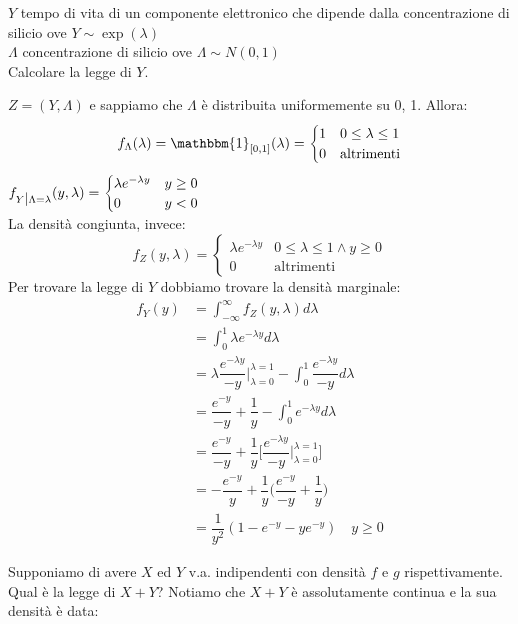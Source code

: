 \documentclass[12pt]{report}
\newcounter{exercise}
\begin{document}
	\begin{exercise}{}{}
		\begin{assignment}{}{}
			$Y$ tempo di vita di un componente elettronico che dipende dalla concentrazione di silicio ove $Y \sim \exp(\lambda)$ \\
			$\Lambda$ concentrazione di silicio ove $\Lambda \sim N(0, 1)$ \\
			Calcolare la legge di $Y$.
		\end{assignment}
		$Z = (Y, \Lambda)$ e sappiamo che $\Lambda$ è distribuita uniformemente su 0, 1. Allora:
		\[
		f_\Lambda(\lambda) = \mathbbm{1}_{[0,1]}(\lambda) = \begin{cases}
		1 & 0 \leq \lambda \leq 1 \\
		0 & \text{altrimenti}
		\end{cases}
		\]
		$f_{Y \mathlarger{\mid} \Lambda=\lambda}(y, \lambda) = \begin{cases}
			\lambda e^{-\lambda y} & y \geq 0 \\
			0 & y < 0
		\end{cases}$ \\
		La densità congiunta, invece:
		\[
		f_Z(y, \lambda) = \begin{cases}
			\lambda e^{-\lambda y} & 0 \leq \lambda \leq 1 \wedge y \geq 0 \\
			0 & \text{altrimenti}
		\end{cases}
		\]
		Per trovare la legge di $Y$ dobbiamo trovare la densità marginale:
		\begin{align*}
		f_Y(y) &= \int_{-\infty}^{\infty}f_Z(y, \lambda)d\lambda \\
		&= \int_{0}^{1}\lambda e^{-\lambda y}d\lambda \\
		&= \lambda \dfrac{e^{-\lambda y}}{-y} {\Big|}^{\lambda=1}_{\lambda=0} - \int_{0}^{1}\dfrac{e^{-\lambda y}}{-y}d\lambda \\
		&= \dfrac{e^{-y}}{-y}  + \dfrac{1}{y} - \int_{0}^{1}e^{-\lambda y}d\lambda \\
		&= \dfrac{e^{-y}}{-y}  + \dfrac{1}{y}\Bigg[\dfrac{e^{-\lambda y}}{-y} {\Big|}^{\lambda=1}_{\lambda=0}\Bigg] \\
		&= -\dfrac{e^{-y}}{y} + \dfrac{1}{y}\Bigg(\dfrac{e^{-y}}{-y} + \dfrac{1}{y}\Bigg) \\
		&= \dfrac{1}{y^2}(1 - e^{-y} - ye^{-y}) \quad y \geq 0
		\end{align*}
	\end{exercise}
	Supponiamo di avere $X$ ed $Y$ v.a. indipendenti con densità $f$ e $g$ rispettivamente. Qual è la legge di $X + Y$? Notiamo che $X + Y$ è assolutamente continua e la sua densità è data:
\end{document}
